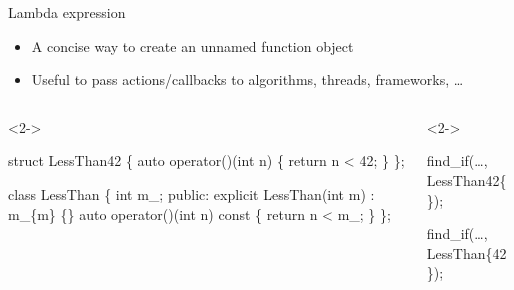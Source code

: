 \begin{frame}[fragile]{Lambda expression}

  \begin{itemize}
  \item A concise way to create an unnamed function object
  \item Useful to pass actions/callbacks to algorithms, threads, frameworks,
    \ldots
  \end{itemize}

  \begin{columns}[t]

    \begin{column}{.5\textwidth}
      \begin{codeblock}<2->{
struct LessThan42 \{
  auto operator()(int n)
  \{
    return n < 42;
  \}
\};

class LessThan \{
  int m\_;
 public:
  explicit LessThan(int m)
    : m\_\{m\} \{\}
  auto operator()(int n) const
  \{
    return n < m_;
  \}
\};}\end{codeblock}

    \end{column}

    \begin{column}{.5\textwidth}
      \begin{codeblock}<2->{
find_if(\ldots, LessThan42\{\});


find_if(\ldots, LessThan\{42\});

}\end{codeblock}
    \end{column}

  \end{columns}
\end{frame}

